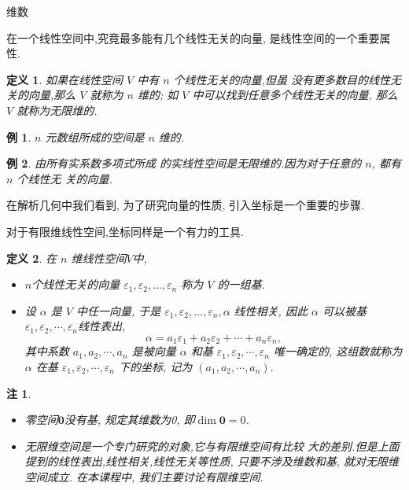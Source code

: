 \documentclass[13pt]{beamer}
\newtheorem{exa}{例}
\newtheorem*{defi}{定义}
\newtheorem*{rem}{注}
\def\dim{\operatorname{dim}}
\def\0{\mathbf{0}}
\def\a{\alpha}
\begin{document}
\begin{frame}{维数}

在一个线性空间中,究竟最多能有几个线性无关的向量, 是线性空间的一个重要属性.
\begin{defi}
如果在线性空间 $V$ 中有 $n$ 个线性无关的向量,但虽 没有更多数目的线性无关的向量,那么 $V$ 就称为 $n$ 维的; 如 $V$ 中可以找到任意多个线性无关的向量, 那么 $V$ 就称为无限维的.
\end{defi}

\begin{exa}
	$n$ 元数组所成的空间是 $n$ 维的.
\end{exa}

\begin{exa}
由所有实系数多项式所成 的实线性空间是无限维的.因为对于任意的 $n$, 都有 $n$ 个线性无 关的向量.
\end{exa}
\end{frame}



\begin{frame}
在解析几何中我们看到, 为了研究向量的性质, 引入坐标是一个重要的步骤.

对于有限维线性空间,坐标同样是一个有力的工具.

\begin{defi}
在 $n$ 维线性空间$V$中, 
\begin{itemize}
\item 	$n$个线性无关的向量 
${\varepsilon}_{1}, {\varepsilon}_{2}, \ldots, {\varepsilon}_{n}$
称为 $V$ 的一组\alert{基}. 
\item 设 ${\alpha}$ 是 $V$ 中任一向量, 于是 ${\varepsilon}_{1}, {\varepsilon}_{2}, 
\ldots, {\varepsilon}_{n}, {\alpha}$ 线性相关,
因此 ${\a}$ 可以被基 ${\varepsilon}_{1}, {\varepsilon}_{2}, \cdots, {\varepsilon}_{n}$线性表出,
$${\alpha}=a_{1} {\varepsilon}_{1}+a_{2} {\varepsilon}_{2}+\cdots+a_{n} {\varepsilon}_{n},$$
其中系数 $a_{1}, a_{2}, \cdots, a_{n}$ 是被向量 ${\alpha}$ 和基 ${\varepsilon}_{1}, {\varepsilon}_{2}, \cdots, {\varepsilon}_{n}$ 唯一确定的, 
这组数就称为 $\a$ 在基 ${\varepsilon}_{1}, {\varepsilon}_{2}, \cdots, {\varepsilon}_{n}$ 下的\alert{坐标}, 记为 $\left(a_{1}, a_{2}, \cdots, a_{n}\right).$
\end{itemize}
\end{defi}
\end{frame}

\begin{frame}
\begin{rem}
\begin{itemize}
\item 零空间$\0$没有基, 规定其维数为0, 即$\dim \0 = 0$.
\item 无限维空间是一个专门研究的对象,它与有限维空间有比较 大的差别.但是上面提到的线性表出,线性相关,线性无关等性质, 只要不涉及维数和基, 就对无限维空间成立. 在本课程中, 我们主要讨论有限维空间. 
\end{itemize}
\end{rem}
\end{frame}
\end{document}
